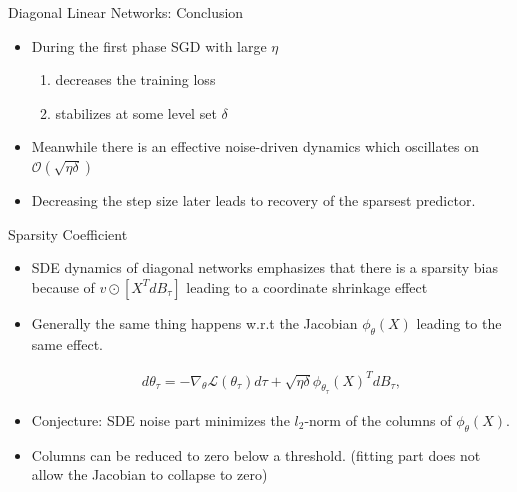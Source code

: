 \documentclass[fleqn]{beamer}
\begin{document}
    \begin{frame}{Diagonal Linear Networks: Conclusion}
        \begin{itemize}[<+->]
            \item During the first phase SGD with large $\eta$
                \begin{enumerate}
                    \item decreases the training loss
                    \item stabilizes at some level set $\delta$
                \end{enumerate}
            \item Meanwhile there is an effective noise-driven dynamics
                which oscillates on $\mathcal{O}(\sqrt{\eta\delta})$
            \item Decreasing the step size later leads to recovery of the
                sparsest predictor.
        \end{itemize}
    \end{frame}

    \begin{frame}{Sparsity Coefficient}
        \begin{itemize}[<+->]
             \item SDE dynamics of diagonal networks emphasizes that there is
                 a sparsity bias because of $v \odot [X^{T}dB_\tau]$ leading
                 to a coordinate shrinkage effect
            \item Generally the same thing happens w.r.t the Jacobian
                $\phi_\theta(X)$ leading to the same effect.
            \begin{center}
            \begin{minipage}{0.5\textwidth}
                \begin{align*}
                    d\theta_\tau = -\nabla_\theta \mathcal{L}(\theta_\tau)d\tau
                    + \sqrt{\eta\delta}
                    \phi_{\theta_\tau}\left(X\right)^{T}dB_\tau,
                \end{align*}
            \end{minipage}
            \end{center}
            \item Conjecture: SDE noise part minimizes the $l_{2}$-norm of
                the columns of $\phi_\theta(X)$.

            \item Columns can be reduced to zero below a threshold. (fitting
                part does not allow the Jacobian to collapse to zero)
         \end{itemize}
    \end{frame}
\end{document}
